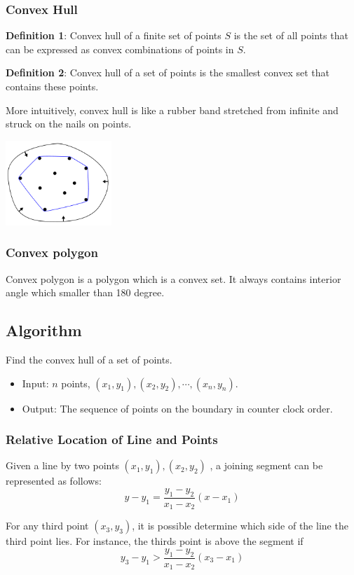 \subsubsection{Convex Hull}
\textbf{Definition 1}: Convex hull of a finite set of points $S$ is the set of 
all points that can be expressed as convex combinations of points in $S$. 

\textbf{Definition 2}: Convex hull of a set of points is the smallest convex 
set that contains these points.
 
More intuitively, convex hull is like a rubber band stretched from infinite and 
struck on the nails on points.

\centerline{\includegraphics[width=0.3\textwidth]{ConvexHull.png}}

\subsubsection{Convex polygon}
Convex polygon is a polygon which is a convex set. It always contains interior 
angle which smaller than 180 degree.
\subsection{Algorithm}
Find the convex hull of a set of points.
\begin{itemize}
 \item Input: $n$ points, $(x_1, y_1), (x_2, y_2), \cdots, (x_n, y_n)$.
 \item Output: The sequence of points on the boundary in counter clock order.
\end{itemize}

\subsubsection{Relative Location of Line and Points}
Given a line by two points $(x_1, y_1), (x_2, y_2)$ , a joining segment can 
be represented as follows:
\[y - y_1 = \frac{y_1 - y_2}{x_1 - x_2} (x - x_1)\]

For any third point $(x_3, y_3)$, it is possible determine which side of the 
line the third point lies. For instance, the thirds point is above the segment 
if 
\[y_3 - y_1 > \frac{y_1 - y_2}{x_1 - x_2} (x_3 - x_1)\]

